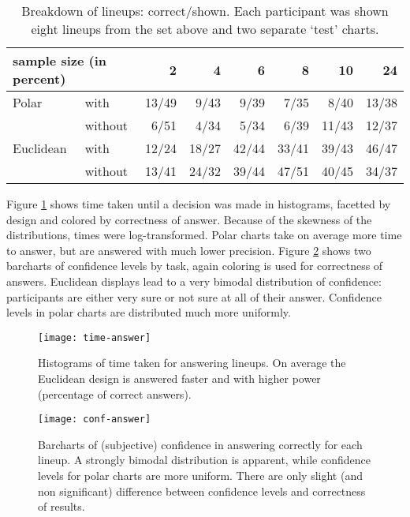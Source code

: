 \begin{table}[hbtp]
\resizebox{\linewidth}{!} {
	\begin{tabular}{ll|@{}r|@{}r|@{}r|@{}r|@{}r|@{}r}
	\multicolumn{2}{l}{sample size (in percent)}  & 2 & 4 & 6 & 8 & 10 & 24 \\ [1pt] \hline
	Polar & with & 13/49& 9/43 & 9/39 & 7/35 & 8/40 & 13/38 \\
	& without & 6/51&   4/34 &  5/34 &  6/39 & 11/43 &  12/37\\ [1pt] \hline
	Euclidean & with &12/24& 18/27 & 42/44 & 33/41 & 39/43 & 46/47\\
	& without & 13/41 &24/32& 39/44 & 47/51 & 40/45 & 34/37\\
	\end{tabular}
	}
\caption{\label{tbl:treatment} Breakdown of lineups: correct/shown. Each participant was shown eight lineups from the set above and two separate `test' charts.}
\end{table}

Figure \ref{fig:time} shows time taken until a decision was made in histograms, facetted by design and colored by correctness of answer. Because of the skewness of the distributions, times were log-transformed. Polar charts take on average more time to answer, but are answered with much lower precision. Figure \ref{fig:conf} shows two barcharts of confidence levels by task, again coloring is used for correctness of answers. Euclidean displays lead to a very bimodal distribution of confidence: participants are either very sure or not sure at all of their answer. Confidence levels in polar charts are distributed much more uniformly.

\begin{figure}[htbp] %
   \centering
   \texttt{[image: time-answer]} 
   \caption{Histograms of time taken for answering lineups. On average the Euclidean design is answered faster and with higher power (percentage of correct answers). }
   \label{fig:time}
\end{figure}

\begin{figure}[htbp] %
   \centering
   \texttt{[image: conf-answer]} 
   \caption{Barcharts of (subjective) confidence in answering correctly for each lineup. A strongly bimodal distribution is apparent, while confidence levels for polar charts are more uniform. There are only slight (and non significant) difference between confidence levels and correctness of results.}
   \label{fig:conf}
\end{figure}



